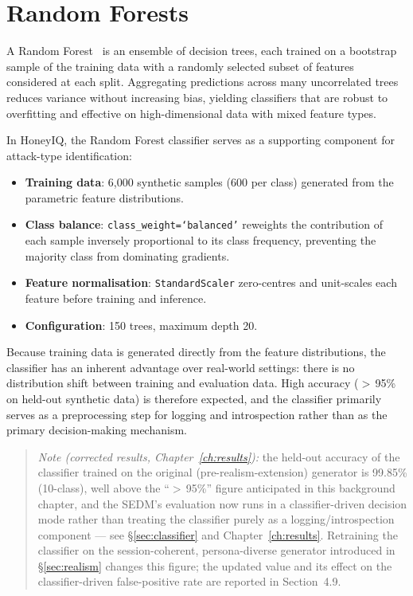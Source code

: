 \section{Random Forests}
\label{sec:bg_rf}

A Random Forest~\citep{breiman2001random} is an ensemble of decision trees,
each trained on a bootstrap sample of the training data with a randomly
selected subset of features considered at each split.
Aggregating predictions across many uncorrelated trees reduces variance
without increasing bias, yielding classifiers that are robust to overfitting
and effective on high-dimensional data with mixed feature types.

In HoneyIQ, the Random Forest classifier serves as a supporting component
for attack-type identification:
%
\begin{itemize}
  \item \textbf{Training data}: 6,000 synthetic samples (600 per class)
        generated from the parametric feature distributions.
  \item \textbf{Class balance}: \texttt{class\_weight=`balanced'} reweights
        the contribution of each sample inversely proportional to its class
        frequency, preventing the majority class from dominating gradients.
  \item \textbf{Feature normalisation}: \texttt{StandardScaler} zero-centres
        and unit-scales each feature before training and inference.
  \item \textbf{Configuration}: 150 trees, maximum depth 20.
\end{itemize}

Because training data is generated directly from the feature distributions,
the classifier has an inherent advantage over real-world settings: there is
no distribution shift between training and evaluation data.
High accuracy ($>$\,95\% on held-out synthetic data) is therefore expected,
and the classifier primarily serves as a preprocessing step for logging and
introspection rather than as the primary decision-making mechanism.

\begin{quote}
\noindent\textit{Note (corrected results, Chapter~\ref{ch:results}):} the
held-out accuracy of the classifier trained on the original
(pre-realism-extension) generator is 99.85\% (10-class), well above the
``$>$\,95\%'' figure anticipated in this background chapter, and the SEDM's
evaluation now runs in a classifier-driven decision mode rather than
treating the classifier purely as a logging/introspection component --- see
\S\ref{sec:classifier} and Chapter~\ref{ch:results}. Retraining the
classifier on the session-coherent, persona-diverse generator introduced in
\S\ref{sec:realism} changes this figure; the updated value and its effect on
the classifier-driven false-positive rate are reported in Section~4.9.
\end{quote}


